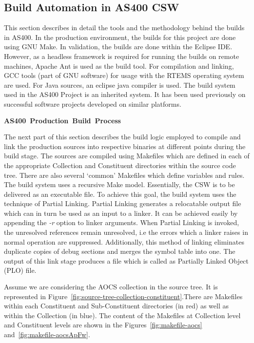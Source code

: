 \documentclass[12pt, a4paper, titlepage]{scrartcl}
\newcommand{\courierword}[1]{\textsf{\itshape #1}}{\fontfamily{pcr}\selectfont}%
\begin{document}
\subsection{Build Automation in AS400 CSW}
This section describes in detail the tools and the methodology behind the builds in AS400. In the production environment, the builds for this project are done using GNU Make. In validation, the builds are done within the Eclipse IDE. However, as a headless framework is required for running the builds on remote machines, Apache Ant is used as the build tool. For compilation and linking, GCC tools (part of GNU software) for usage with the RTEMS operating system are used. For Java sources, an eclipse java compiler is used. 
The build system used in the AS400 Project is an inherited system. It has been used previously on successful software projects developed on similar platforms.
\linebreak
\par \textbf{AS400\ Production\ Build\ Process}
\par The next part of this section describes the build logic employed to compile and link the production sources into respective binaries at different points during the build stage. The sources are compiled using Makefiles which are defined in each of the appropriate Collection and Constituent directories within the source code tree. There are also several ‘common’ Makefiles which define variables and rules. The build system uses a recursive Make\cite{stallman1991gnu} model.   
Essentially, the CSW is to be delivered as an executable file. To achieve this goal, the build system uses the technique of Partial Linking\cite{ARMPartialLinking}. Partial Linking generates a relocatable output file which can in turn be used as an input to a linker. It can be achieved easily by appending the \courierword{-r} option to linker arguments. When Partial Linking is invoked, the unresolved references remain unresolved, i.e the errors which a linker raises in normal operation are suppressed. Additionally, this method of linking eliminates duplicate copies of debug sections and merges the symbol table into one. The output of this link stage produces a file which is called as Partially Linked Object (PLO) file.
\par Assume we are considering the AOCS collection in the source tree. It is represented in Figure~\ref{fig:source-tree-collection-constituent}.There are Makefiles within each Constituent and Sub-Constituent directories (in red) as well as within the Collection (in blue). The content of the Makefiles at Collection level and Constituent levels are shown in the Figures~\ref{fig:makefile-aocs} and~\ref{fig:makefile-aocsApFw}. 
\end{document}
